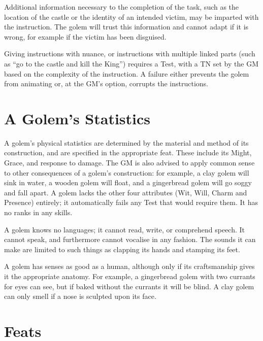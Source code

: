 Additional information necessary to the completion of the task, such as the location of the castle or the identity of an intended victim, may be imparted with the instruction.
The golem will trust this information and cannot adapt if it is wrong, for example if the victim has been disguised.

Giving instructions with nuance, or instructions with multiple linked parts (such as ``go to the castle and kill the King'') requires a Test, with a TN set by the GM based on the complexity of the instruction.
A failure either prevents the golem from animating or, at the GM's option, corrupts the instructions.

\section{A Golem's Statistics}

A golem's physical statistics are determined by the material and method of its construction, and are specified in the appropriate feat.
These include its Might, Grace, and response to damage.
The GM is also advised to apply common sense to other consequences of a golem's construction: for example, a clay golem will sink in water, a wooden golem will float, and a gingerbread golem will go soggy and fall apart.
A golem lacks the other four attributes (Wit, Will, Charm and Presence) entirely; it automatically fails any Test that would require them.
It has no ranks in any skills.

A golem knows no languages; it cannot read, write, or comprehend speech.
It cannot speak, and furthermore cannot vocalise in any fashion.
The sounds it can make are limited to such things as clapping its hands and stamping its feet.

A golem has senses as good as a human, although only if its craftsmanship gives it the appropriate anatomy.
For example, a gingerbread golem with two currants for eyes can see, but if baked without the currants it will be blind.
A clay golem can only smell if a nose is sculpted upon its face.

\section{Feats}

